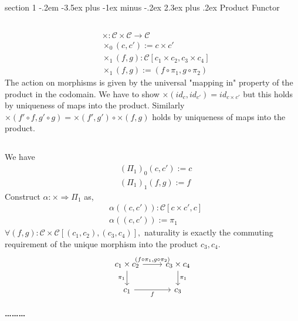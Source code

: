 \documentclass[12pt]{article}
\makeatletter
\theoremstyle{definition}
\newenvironment{problem}{\@startsection
       {section}
       {1}
       {-.2em}
       {-3.5ex plus -1ex minus -.2ex}
       {2.3ex plus .2ex}
       {\pagebreak[3]%
       \large\bf\noindent{Problem }
       }
       }
       {%
       \begin{center}\large\bf \ldots\ldots\ldots\end{center}}
\newcommand{\cat}{\mathcal}
\makeatother
\begin{document}
\begin{problem}{Product Functor}
    \subsection{}
    \begin{align*}
        &\times : \cat C \times \cat C \to \cat C\\
        &\times_0(c,c') := c \times c'\\
        &\times_1(f,g) : \cat C[c_1 \times c_2, c_3 \times c_4]\\
        &\times_1(f,g) := (f \circ \pi_1,g \circ \pi_2)
    \end{align*}
The action on morphisms is given by the universal "mapping in" property of the product in the codomain.
We have to show $\times(id_c,id_{c'})=id_{c\times c'}$ but this holds by uniqueness of maps into the product. Similarly $\times(f'\circ f, g' \circ g)=\times(f',g') \circ \times(f,g)$ holds by uniqueness of maps into the product.

\subsection{}
We have 
\begin{align*}
    &(\Pi_1)_0(c,c') := c\\
    &(\Pi_1)_1(f,g) := f
\end{align*}
Construct $\alpha : \times \Rightarrow \Pi_1$ as,
\begin{align*}
    &\alpha((c, c')) : \cat C[c \times c', c ]\\
    &\alpha((c,c')) := \pi_1 
\end{align*}
$\forall (f,g) : \cat C\times \cat C[(c_1,c_2),(c_3,c_4)],$ naturality is exactly the commuting requirement of the unique morphism into the product $c_3,c_4$.
\[
\begin{tikzcd}
    c_1 \times c_2 \arrow[r, "{(f\circ \pi_1,g \circ \pi_2)}"] \arrow[d, "\pi_1"'] & c_3 \times c_4 \arrow[d, "\pi_1"] \\
    c_1 \arrow[r, "f"'] & c_3
    \end{tikzcd}
\]



\end{problem}
\end{document}
